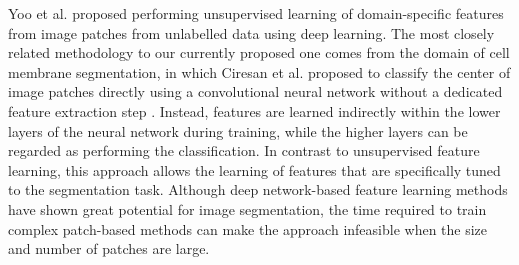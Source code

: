 Yoo et al. \cite{yoo2014} proposed performing unsupervised learning of
domain-specific features from image patches from unlabelled data using deep
learning. The most closely related methodology to our currently proposed one
comes from the domain of cell membrane segmentation, in which Ciresan et al.
proposed to classify the center of image patches directly using a convolutional
neural network \cite{LeCun1998} without a dedicated feature extraction step
\cite{Ciresan2012}. Instead, features are learned indirectly within the lower
layers of the neural network during training, while the higher layers can be
regarded as performing the classification. In contrast to unsupervised feature
learning, this approach allows the learning of features that are specifically
tuned to the segmentation task. Although deep network-based feature learning
methods have shown great potential for image segmentation, the time required to
train complex patch-based methods can make the approach infeasible when the size
and number of patches are large.


% 
% 
%   


